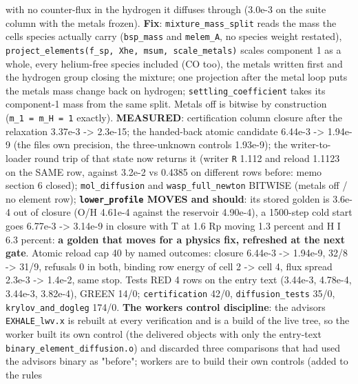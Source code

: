 \documentclass[english,a4paper]{my_memo}
\begin{document}
\begin{itemize}
  with no counter-flux in the hydrogen it diffuses through (3.0e-3 on the
  suite column with the metals frozen). \textbf{Fix}: \texttt{mixture\_mass\_split} reads
  the mass the cell\textquotesingle s species actually carry (\texttt{bsp\_mass} and \texttt{melem\_A}, no
  species weight restated), \texttt{project\_elements(f\_sp,\ Xhe,\ msum,\ scale\_metals)}
  scales component 1 as a whole, every helium-free species included (CO
  too), the metals written first and the hydrogen group closing the mixture;
  one projection after the metal loop puts the metals\textquotesingle{} mass change back on
  hydrogen; \texttt{settling\_coefficient} takes its component-1 mass from the same
  split. Metals off is bitwise by construction (\texttt{m\_1\ =\ m\_H\ =\ 1} exactly).
  \textbf{MEASURED}: certification column closure after the relaxation 3.37e-3 -\textgreater{}
  2.3e-15; the handed-back atomic candidate 6.44e-3 -\textgreater{} 1.94e-9 (the file\textquotesingle s
  own precision, the three-unknown control\textquotesingle s 1.93e-9); the writer-to-loader
  round trip of that state now returns it (writer \texttt{\textbar{}\textbar{}R\textbar{}\textbar{}} 1.112 and reload
  1.1123 on the SAME row, against 3.2e-2 vs 0.4385 on different rows before:
  memo section 6 closed); \texttt{mol\_diffusion} and \texttt{wasp\_full\_newton} BITWISE
  (metals off / no element row); \textbf{\texttt{lower\_profile} MOVES and should}: its
  stored golden is 3.6e-4 out of closure (O/H 4.61e-4 against the reservoir
  4.90e-4), a 1500-step cold start goes 6.77e-3 -\textgreater{} 3.14e-9 in closure with
  T at 1.6 Rp moving 1.3 percent and H I 6.3 percent: \textbf{a golden that moves
  for a physics fix, refreshed at the next gate}. Atomic reload cap 40 by
  named outcomes: closure 6.44e-3 -\textgreater{} 1.94e-9, 32/8 -\textgreater{} 31/9, refusals 0 in
  both, binding row energy of cell 2 -\textgreater{} cell 4, flux spread 2.3e-3 -\textgreater{}
  1.4e-2, same stop. Tests RED 4 rows on the entry text (3.44e-3, 4.78e-4,
  3.44e-3, 3.82e-4), GREEN 14/0; \texttt{certification} 42/0, \texttt{diffusion\_tests}
  35/0, \texttt{krylov\_and\_dogleg} 174/0. \textbf{The worker\textquotesingle s control discipline}: the
  advisor\textquotesingle s \texttt{EXHALE\_lwv.x} is rebuilt at every verification and is a build
  of the live tree, so the worker built its own control (the delivered
  objects with only the entry-text \texttt{binary\_element\_diffusion.o}) and
  discarded three comparisons that had used the advisor\textquotesingle s binary as
  "before"; workers are to build their own controls (added to the rules

\end{itemize}
\end{document}
